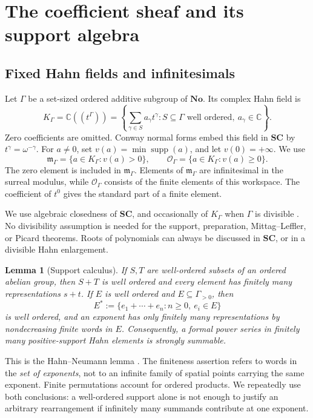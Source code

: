 \documentclass[11pt,letterpaper]{article}
\newtheorem{lemma}[lemma]{Lemma}
\theoremstyle{definition}
\theoremstyle{remark}
\newcommand{\No}{\mathbf{No}}
\newcommand{\SC}{\mathbf{SC}}
\newcommand{\C}{\mathbb C}
\newcommand{\OO}{\mathcal O}
\newcommand{\KK}{K_\Gamma}
\newcommand{\mm}{\mathfrak m_\Gamma}
\newcommand{\supp}{\operatorname{supp}}
\numberwithin{equation}{section}
\begin{document}
\section{The coefficient sheaf and its support algebra}\label{sec:setup}
\subsection{Fixed Hahn fields and infinitesimals}
Let $\Gamma$ be a set-sized ordered additive subgroup of $\No$. Its complex Hahn field is
\[
 \KK=\C((t^\Gamma))
 =\left\{\sum_{\gamma\in S}a_\gamma t^\gamma:
 S\subseteq\Gamma\text{ well ordered},\ a_\gamma\in\C\right\}.
\]
Zero coefficients are omitted. Conway normal forms embed this field in $\SC$ by $t^\gamma=\omega^{-\gamma}$. For $a\ne0$, set $v(a)=\min\supp(a)$, and let $v(0)=+\infty$. We use
\[
 \mm=\{a\in\KK:v(a)>0\},
 \qquad \OO_\Gamma=\{a\in\KK:v(a)\ge0\}.
\]
The zero element is included in $\mm$. Elements of $\mm$ are infinitesimal in the surreal modulus, while $\OO_\Gamma$ consists of the finite elements of this workspace. The coefficient of $t^0$ gives the standard part of a finite element.

We use algebraic closedness of $\SC$, and occasionally of $\KK$ when $\Gamma$ is divisible \cite{Poonen}. No divisibility assumption is needed for the support, preparation, Mittag--Leffler, or Picard theorems. Roots of polynomials can always be discussed in $\SC$, or in a divisible Hahn enlargement.

\begin{lemma}[Support calculus]\label{lem:support}
If $S,T$ are well-ordered subsets of an ordered abelian group, then $S+T$ is well ordered and every element has finitely many representations $s+t$. If $E$ is well ordered and $E\subseteq\Gamma_{>0}$, then
\[
 E^*:=\{e_1+\cdots+e_n:n\ge0,\ e_i\in E\}
\]
is well ordered, and an exponent has only finitely many representations by nondecreasing finite words in $E$. Consequently, a formal power series in finitely many positive-support Hahn elements is strongly summable.
\end{lemma}
This is the Hahn--Neumann lemma \cite{Neumann,Poonen}. The finiteness assertion refers to words in the \emph{set of exponents}, not to an infinite family of spatial points carrying the same exponent. Finite permutations account for ordered products. We repeatedly use both conclusions: a well-ordered support alone is not enough to justify an arbitrary rearrangement if infinitely many summands contribute at one exponent.
\end{document}
